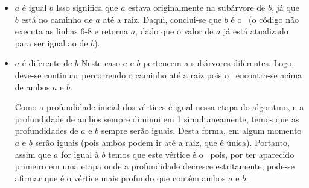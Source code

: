 \begin{itemize}
    \item $a$ é igual $b$
        \newline Isso significa que $a$ estava originalmente na subárvore de $b$, já que $b$ está no caminho de $a$ até a raiz. Daqui, conclui-se que $b$ é o \LCA\ (o código não executa as linhas 6-8 e retorna $a$, dado que o valor de $a$ já está atualizado para ser igual ao de $b$).
        
    \item $a$ é diferente de $b$
        \newline Neste caso $a$ e $b$ pertencem a subárvores diferentes. Logo, deve-se continuar percorrendo o caminho até a raiz pois o \LCA\ encontra-se acima de ambos $a$ e $b$.
        
        Como a profundidade inicial dos vértices é igual nessa etapa do algoritmo, e a profundidade de ambos sempre diminui em 1 simultaneamente, temos que as profundidades de $a$ e $b$ sempre serão iguais. Desta forma, em algum momento $a$ e $b$ serão iguais (pois ambos podem ir até a raiz, que é única). Portanto, assim que $a$ for igual à $b$ temos que este vértice é o \LCA\ pois, por ter aparecido primeiro em uma etapa onde a profundidade decresce estritamente, pode-se afirmar que é o vértice mais profundo que contêm ambos $a$ e $b$.
\end{itemize}
\endfalse

